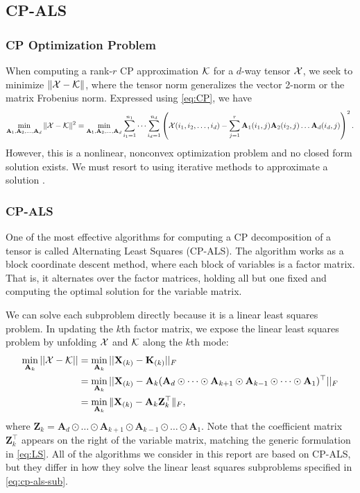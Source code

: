 \documentclass{article}
\newcommand{\mat}[1]{\mathbf{#1}}
\newcommand{\T}[2][]{#1{\mathbf{\cal{#2}}}} 						%
\begin{document}
\subsection{CP-ALS} \label{sec:cp-als}

\subsubsection{CP Optimization Problem}

When computing a rank-$r$ CP approximation $\T{K}$ for a $d$-way tensor $\T{X}$, we seek to minimize $\| \T{X} - \T{K} \|$, where the tensor norm generalizes the vector 2-norm or the matrix Frobenius norm.
Expressed using \cref{eq:CP}, we have  
$$\min_{\mat{A}_1,\mat{A}_2, \dots,\mat{A}_d} \| \T{X} - \T{K} \|^2 = \min_{\mat{A}_1,\mat{A}_2, \dots,\mat{A}_d} \sum_{i_1=1}^{n_1} \cdots \sum_{i_d=1}^{n_d} \left(\T{X}(i_1,i_2,\dots, i_d) - \sum^{r}_{j=1} \mat{A}_1(i_1,j)\mat{A}_2(i_2,j) \dots \mat{A}_d(i_d,j) \right)^2. $$
However, this is a nonlinear, nonconvex optimization problem and no closed form solution exists. 
We must resort to using iterative methods to approximate a solution \cite{kolda2009tensor}.

\subsubsection{CP-ALS}

One of the most effective algorithms for computing a CP decomposition of a tensor is called Alternating Least Squares (CP-ALS).
The algorithm works as a block coordinate descent method, where each block of variables is a factor matrix.
That is, it alternates over the factor matrices, holding all but one fixed and computing the optimal solution for the variable matrix.

We can solve each subproblem directly because it is a linear least squares problem.
In updating the $k$th factor matrix, we expose the linear least squares problem by unfolding $\T{X}$ and $\T{K}$ along the $k$th mode:
\begin{align}
\label{eq:cp-als-sub}
\min_{\mat{A}_k}||\T{X} - \T{K}|| &= \min_{\mat{A}_k}||\mat{X}_{(k)} - \mat{K}_{(k)}||_F \notag \\ 
&=  \min_{\mat{A}_k}||\mat{X}_{(k)} - \mat{A}_k(\mat{A}_d \odot \dots \odot \mat{A}_{k+1} \odot \mat{A}_{k-1} \odot \dots \odot \mat{A}_1)^\top||_F \notag \\ 
&=  \min_{\mat{A}_k}\|\mat{X}_{(k)}-\mat{A}_k\mat{Z}_k^\top\|_F,
\end{align}
where $\mat{Z}_k=\mat{A}_d \odot \dots \odot \mat{A}_{k+1} \odot \mat{A}_{k-1} \odot \dots \odot \mat{A}_1$.
Note that the coefficient matrix $\mat{Z}_k^\top$ appears on the right of the variable matrix, matching the generic formulation in \cref{eq:LS}.
All of the algorithms we consider in this report are based on CP-ALS, but they differ in how they solve the linear least squares subproblems specified in \cref{eq:cp-als-sub}.
\end{document}
